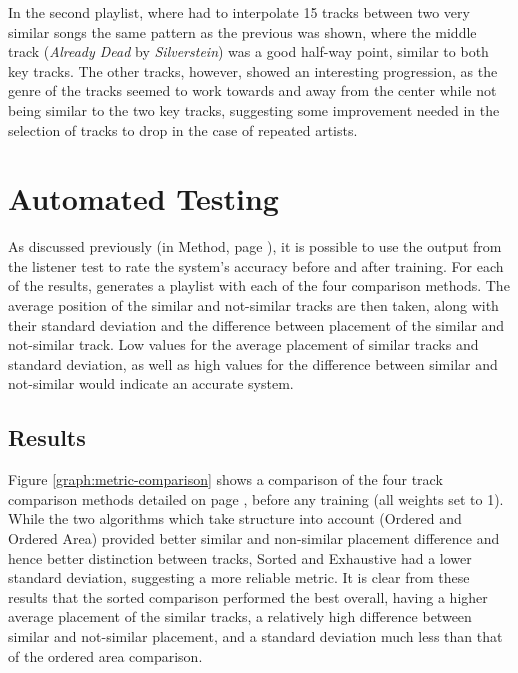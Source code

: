 In the second playlist, where  had to interpolate 15 tracks between two very similar songs the same pattern as the previous was shown, where the middle track (\emph{Already Dead} by \emph{Silverstein}) was a good half-way point, similar to both key tracks. The other tracks, however, showed an interesting progression, as the genre of the tracks seemed to work towards and away from the center while not being similar to the two key tracks, suggesting some improvement needed in the selection of tracks to drop in the case of repeated artists.
\pagebreak
\section{Automated Testing}
As discussed previously (in Method, page \pageref{text:method:weight_optimisation}), it is possible to use the output from the listener test to rate the system's accuracy before and after training. For each of the results,  generates a playlist with each of the four comparison methods. The average position of the similar and not-similar tracks are then taken, along with their standard deviation and the difference between placement of the similar and not-similar track. Low values for the average placement of similar tracks and standard deviation, as well as high values for the difference between similar and not-similar would indicate an accurate system.
\subsection{Results}
Figure \ref{graph:metric-comparison} shows a comparison of the four track comparison methods detailed on page \pageref{text:method:comparison_methods}, before any training (all weights set to 1). While the two algorithms which take structure into account (Ordered and Ordered Area) provided better similar and non-similar placement difference and hence better distinction between tracks, Sorted and Exhaustive had a lower standard deviation, suggesting a more reliable metric. It is clear from these results that the sorted comparison performed the best overall, having a higher average placement of the similar tracks, a relatively high difference between similar and not-similar placement, and a standard deviation much less than that of the ordered area comparison.

